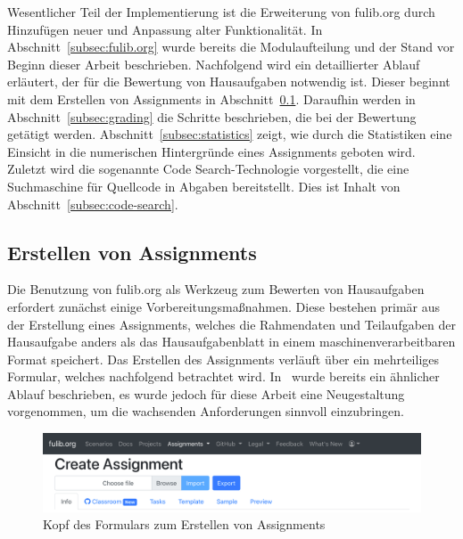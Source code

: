 Wesentlicher Teil der Implementierung ist die Erweiterung von fulib.org durch Hinzufügen neuer und Anpassung alter Funktionalität.
In Abschnitt~\ref{subsec:fulib.org} wurde bereits die Modulaufteilung und der Stand vor Beginn dieser Arbeit beschrieben.
Nachfolgend wird ein detaillierter Ablauf erläutert, der für die Bewertung von Hausaufgaben notwendig ist.
Dieser beginnt mit dem Erstellen von Assignments in Abschnitt~\ref{subsec:creating-assignments}.
Daraufhin werden in Abschnitt~\ref{subsec:grading} die Schritte beschrieben, die bei der Bewertung getätigt werden.
Abschnitt~\ref{subsec:statistics} zeigt, wie durch die Statistiken eine Einsicht in die numerischen Hintergründe eines Assignments geboten wird.
Zuletzt wird die sogenannte Code Search-Technologie vorgestellt, die eine Suchmaschine für Quellcode in Abgaben bereitstellt.
Dies ist Inhalt von Abschnitt~\ref{subsec:code-search}.

\subsection{Erstellen von Assignments}\label{subsec:creating-assignments}

Die Benutzung von fulib.org als Werkzeug zum Bewerten von Hausaufgaben erfordert zunächst einige Vorbereitungsmaßnahmen.
Diese bestehen primär aus der Erstellung eines Assignments, welches die Rahmendaten und Teilaufgaben der Hausaufgabe anders als das Hausaufgabenblatt in einem maschinenverarbeitbaren Format speichert.
Das Erstellen des Assignments verläuft über ein mehrteiliges Formular, welches nachfolgend betrachtet wird.
In~\cite{bachelor-thesis} wurde bereits ein ähnlicher Ablauf beschrieben, es wurde jedoch für diese Arbeit eine Neugestaltung vorgenommen, um die wachsenden Anforderungen sinnvoll einzubringen.

\begin{figure}
    \centering
    \includegraphics[width=\textwidth]{images/assignment-create-head}
    \caption{Kopf des Formulars zum Erstellen von Assignments}
    \label{fig:assignment-create-head}
\end{figure}

